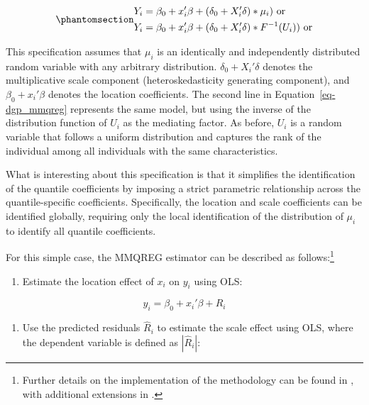 \documentclass[bib]{statapress}
\providecommand{\tightlist}{%
  \setlength{\itemsep}{0pt}\setlength{\parskip}{0pt}}\usepackage{longtable,booktabs,array}
\begin{document}
\begin{equation}\phantomsection\label{eq-dgp_mmqreg}{\begin{aligned}
Y_{i} &= \beta_0 + x_{i}' \beta + (\delta_0 + X_{i}' \delta)*\mu_i) \text{ or} \\
Y_{i} &= \beta_0 + x_{i}' \beta + (\delta_0 + X_{i}' \delta)*F^{-1}(U_i)) \text{ or} 
\end{aligned}
}\end{equation}

This specification assumes that \(\mu_i\) is an identically and
independently distributed random variable with any arbitrary
distribution. \(\delta_0 + X_{i}' \delta\) denotes the multiplicative
scale component (heteroskedasticity generating component), and
\(\beta_0 + x_{i}' \beta\) denotes the location coefficients. The second
line in Equation~\ref{eq-dgp_mmqreg} represents the same model, but
using the inverse of the distribution function of \(U_i\) as the
mediating factor. As before, \(U_i\) is a random variable that follows a
uniform distribution and captures the rank of the individual among all
individuals with the same characteristics.

What is interesting about this specification is that it simplifies the
identification of the quantile coefficients by imposing a strict
parametric relationship across the quantile-specific coefficients.
Specifically, the location and scale coefficients can be identified
globally, requiring only the local identification of the distribution of
\(\mu_i\) to identify all quantile coefficients.

For this simple case, the MMQREG estimator can be described as
follows:\footnote{Further details on the implementation of the
  methodology can be found in \citet{mss2019}, with additional
  extensions in \citet{riosavila2024}.}

\begin{enumerate}
\def\labelenumi{\arabic{enumi}.}
\tightlist
\item
  Estimate the location effect of \(x_{i}\) on \(y_{i}\) using OLS:
\end{enumerate}

\[y_{i} = \beta_0 + x_{i}' \beta + R_i\]

\begin{enumerate}
\def\labelenumi{\arabic{enumi}.}
\setcounter{enumi}{1}
\tightlist
\item
  Use the predicted residuals \(\hat R_i\) to estimate the scale effect
  using OLS, where the dependent variable is defined as \(|\hat R_i|\):
\end{enumerate}
\end{document}
